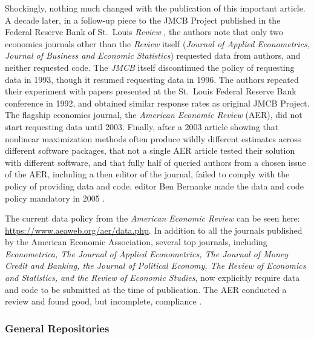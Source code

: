 \documentclass[12pt] {article}
\begin{document}
Shockingly, nothing much changed with the publication of this important
article. A decade later, in a follow-up piece to the JMCB Project
published in the Federal Reserve Bank of St.~Louis \emph{Review}
\citep{anderson_replication_1994}, the authors note that only two economics
journals other than the \emph{Review} itself (\emph{Journal of Applied
Econometrics, Journal of Business and Economic Statistics}) requested
data from authors, and neither requested code. The \emph{JMCB} itself
discontinued the policy of requesting data in 1993, though it resumed
requesting data in 1996. The authors repeated their experiment with
papers presented at the St.~Louis Federal Reserve Bank conference in
1992, and obtained similar response rates as original JMCB Project. The
flagship economics journal, the \emph{American Economic Review} (AER),
did not start requesting data until 2003. Finally, after a 2003 article
showing that nonlinear maximization methods often produce wildly
different estimates across different software packages, that not a
single AER article tested their solution with different software, and
that fully half of queried authors from a chosen issue of the AER,
including a then editor of the journal, failed to comply with the policy
of providing data and code, editor Ben Bernanke made the data and code
policy mandatory in 2005 \citep{mccullough_verifying_2003, mccullough_got_2007}.

The current data policy from the \emph{American Economic Review} can be
seen here: \url{https://www.aeaweb.org/aer/data.php}. In addition to all
the journals published by the American Economic Association, several top
journals, including \emph{Econometrica, The Journal of Applied
Econometrics, The Journal of Money Credit and Banking, the Journal of
Political Economy, The Review of Economics and Statistics, and the
Review of Economic Studies}, now explicitly require data and code to be
submitted at the time of publication. The AER conducted a review and
found good, but incomplete, compliance \citep{glandon_report_2010}.



\subsubsection{General Repositories}\label{general-repositories}
\end{document}
